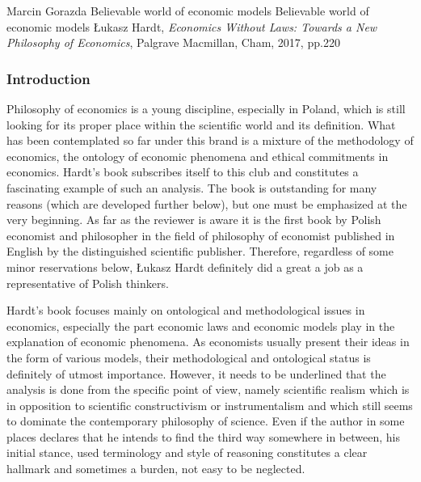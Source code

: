 \begin{recengenv}{Marcin Gorazda}
	{Believable world of economic models}
	{Believable world of economic models}
	{Łukasz Hardt, \textit{Economics Without Laws: Towards a New Philosophy of Economics}, Palgrave Macmillan, Cham, 2017,
		pp.220}
	
	



\subsubsection{Introduction}
Philosophy of economics is a young discipline, especially in Poland, which is still looking for its proper place within
the scientific world and its definition. What has been contemplated so far under this brand is a mixture of the
methodology of economics, the ontology of economic phenomena and ethical commitments in economics. Hardt’s book
subscribes itself to this club and constitutes a fascinating example of such an analysis. The book is outstanding for
many reasons (which are developed further below), but one must be emphasized at the very beginning. As far as the
reviewer is aware it is the first book by Polish economist and philosopher in the field of philosophy of economist
published in English by the distinguished scientific publisher. Therefore, regardless of some minor reservations below,
Łukasz Hardt definitely did a great a job as a representative of Polish thinkers. 

Hardt’s book focuses mainly on ontological and methodological issues in economics, especially the part economic laws and
economic models play in the explanation of economic phenomena. As economists usually present their ideas in the form of
various models, their methodological and ontological status is definitely of utmost importance. However, it needs to be
underlined that the analysis is done from the specific point of view, namely scientific realism which is in opposition
to scientific constructivism or instrumentalism and which still seems to dominate the contemporary philosophy of
science.  Even if the author in some places declares that he intends to find the third way somewhere in between, his
initial stance, used terminology and style of reasoning constitutes a clear hallmark and sometimes a burden, not easy
to be neglected. 


\end{recengenv}
